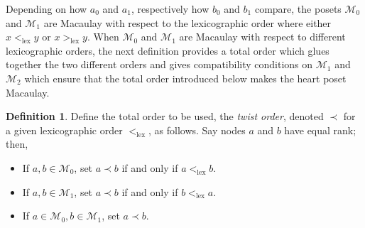 \documentclass[11pt, reqno]{amsart}
\newcommand{\M}{{\mathcal M}}
\def\lex{\operatorname{lex}}
\theoremstyle{plain} %
\theoremstyle{definition}
\newtheorem{defn}[thm]{Definition}
\theoremstyle{remark}
\numberwithin{equation}{section}  %
\begin{document}
Depending on how $a_0$ and $a_1$, respectively how $b_0$ and $b_1$ compare, the posets $\M_0$ and $\M_1$ are Macaulay with respect to the lexicographic order where either $x<_{\lex} y$ or $x>_{\lex} y$. When $\M_0$ and $\M_1$ are Macaulay with respect to different lexicographic orders, the next definition provides a total order which glues together the two different orders and  gives compatibility conditions on $\M_1$ and $\M_2$ which ensure that the total order introduced below makes the heart poset Macaulay.

\begin{defn}

Define the total order to be used, the {\em twist order}, denoted $\prec$ for a given lexicographic order $<_{\lex}$, as follows. Say nodes $a$ and $b$ have equal rank; then,
\begin{itemize}
    \item If $a,b\in \M_0$, set $a\prec b$ if and only if $a<_{\lex} b$.
    \item If $a,b \in \M_1$, set $a \prec b$ if and only if $b<_{\lex} a$.
    \item If $a\in\M_0,b\in\M_1$, set $a \prec b$.
\end{itemize}    
\end{defn}
\end{document}
